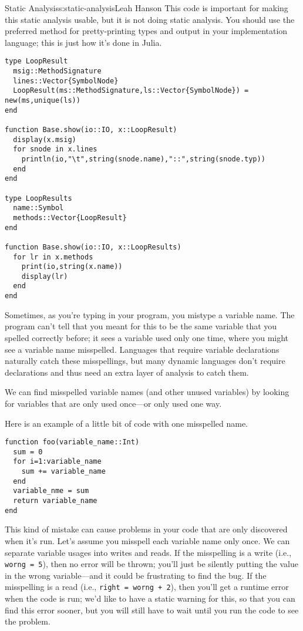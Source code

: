 \begin{aosachapter}{Static Analysis}{s:static-analysis}{Leah Hanson}
This code is important for making this static analysis usable, but it is
not doing static analysis. You should use the preferred method for
pretty-printing types and output in your implementation language; this
is just how it's done in Julia.

\begin{verbatim}
type LoopResult
  msig::MethodSignature
  lines::Vector{SymbolNode}
  LoopResult(ms::MethodSignature,ls::Vector{SymbolNode}) = new(ms,unique(ls))
end

function Base.show(io::IO, x::LoopResult)
  display(x.msig)
  for snode in x.lines
    println(io,"\t",string(snode.name),"::",string(snode.typ))
  end
end

type LoopResults
  name::Symbol
  methods::Vector{LoopResult}
end

function Base.show(io::IO, x::LoopResults)
  for lr in x.methods
    print(io,string(x.name))
    display(lr)
  end
end
\end{verbatim}

\label{looking-for-unused-variables}

Sometimes, as you're typing in your program, you mistype a variable
name. The program can't tell that you meant for this to be the same
variable that you spelled correctly before; it sees a variable used only
one time, where you might see a variable name misspelled. Languages that
require variable declarations naturally catch these misspellings, but
many dynamic languages don't require declarations and thus need an extra
layer of analysis to catch them.

We can find misspelled variable names (and other unused variables) by
looking for variables that are only used once---or only used one way.

Here is an example of a little bit of code with one misspelled name.

\begin{verbatim}
function foo(variable_name::Int)
  sum = 0
  for i=1:variable_name
    sum += variable_name
  end
  variable_nme = sum
  return variable_name
end
\end{verbatim}

This kind of mistake can cause problems in your code that are only
discovered when it's run. Let's assume you misspell each variable name
only once. We can separate variable usages into writes and reads. If the
misspelling is a write (i.e., \texttt{worng = 5}), then no error will be
thrown; you'll just be silently putting the value in the wrong
variable---and it could be frustrating to find the bug. If the
misspelling is a read (i.e., \texttt{right = worng + 2}), then you'll
get a runtime error when the code is run; we'd like to have a static
warning for this, so that you can find this error sooner, but you will
still have to wait until you run the code to see the problem.


\end{aosachapter}
